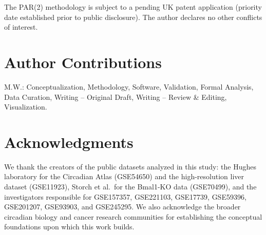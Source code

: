 \documentclass[11pt,a4paper]{article}
\begin{document}
The PAR(2) methodology is subject to a pending UK patent application (priority date established prior to public disclosure). The author declares no other conflicts of interest.

\section*{Author Contributions}

M.W.: Conceptualization, Methodology, Software, Validation, Formal Analysis, Data Curation, Writing -- Original Draft, Writing -- Review \& Editing, Visualization.

\section*{Acknowledgments}

We thank the creators of the public datasets analyzed in this study: the Hughes laboratory for the Circadian Atlas (GSE54650) and the high-resolution liver dataset (GSE11923), Storch et al.\ for the Bmal1-KO data (GSE70499), and the investigators responsible for GSE157357, GSE221103, GSE17739, GSE59396, GSE201207, GSE93903, and GSE245295. We also acknowledge the broader circadian biology and cancer research communities for establishing the conceptual foundations upon which this work builds.
\end{document}
